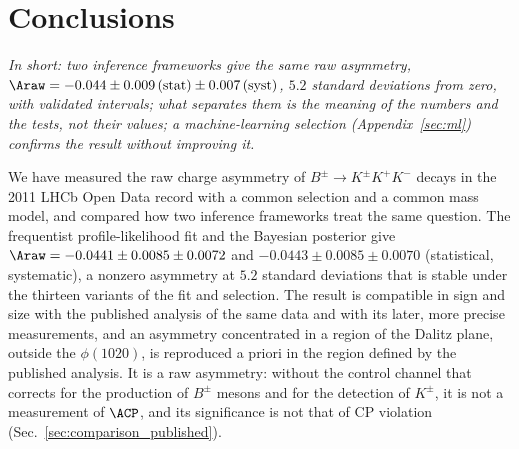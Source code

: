\section{Conclusions}
\label{sec:conclusions}
\emph{In short: two inference frameworks give the same raw asymmetry, $\Araw=-0.044\pm0.009\,(\text{stat})\pm0.007\,(\text{syst})$, $5.2$ standard deviations from zero, with validated intervals; what separates them is the meaning of the numbers and the tests, not their values; a machine-learning selection (Appendix~\ref{sec:ml}) confirms the result without improving it.}

We have measured the raw charge asymmetry of $B^\pm\to K^\pm K^+K^-$ decays in the 2011 LHCb Open Data record with a common selection and a common mass model, and compared how two inference frameworks treat the same question. The frequentist profile-likelihood fit and the Bayesian posterior give $\Araw=-0.0441\pm0.0085\pm0.0072$ and $-0.0443\pm0.0085\pm0.0070$ (statistical, systematic), a nonzero asymmetry at $5.2$ standard deviations that is stable under the thirteen variants of the fit and selection. The result is compatible in sign and size with the published analysis of the same data and with its later, more precise measurements, and an asymmetry concentrated in a region of the Dalitz plane, outside the $\phi(1020)$, is reproduced a priori in the region defined by the published analysis. It is a raw asymmetry: without the control channel that corrects for the production of $B^\pm$ mesons and for the detection of $K^\pm$, it is not a measurement of $\ACP$, and its significance is not that of CP violation (Sec.~\ref{sec:comparison_published}).

